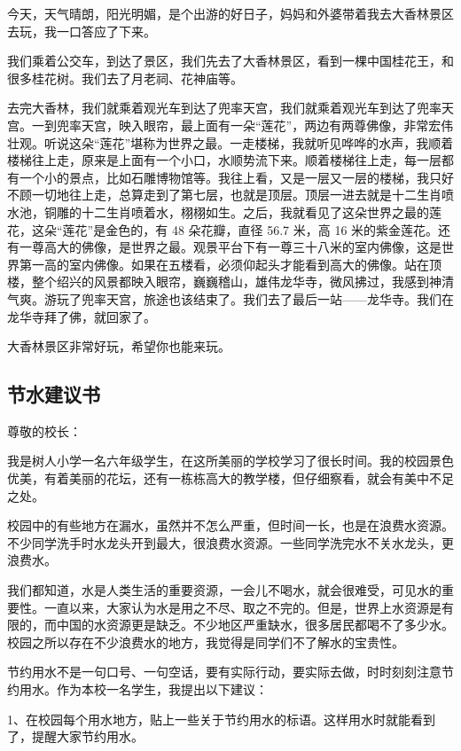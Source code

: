 \documentclass[UTF8,a4paper,titlepage,twoside,10.5pt]{article}
\begin{document}
今天，天气晴朗，阳光明媚，是个出游的好日子，妈妈和外婆带着我去大香林景区去玩，我一口答应了下来。

我们乘着公交车，到达了景区，我们先去了大香林景区，看到一棵中国桂花王，和很多桂花树。我们去了月老祠、花神庙等。

去完大香林，我们就乘着观光车到达了兜率天宫，我们就乘着观光车到达了兜率天宫。一到兜率天宫，映入眼帘，最上面有一朵“莲花”，两边有两尊佛像，非常宏伟壮观。听说这朵“莲花”堪称为世界之最。一走楼梯，我就听见哗哗的水声，我顺着楼梯往上走，原来是上面有一个小口，水顺势流下来。顺着楼梯往上走，每一层都有一个小的景点，比如石雕博物馆等。我往上看，又是一层又一层的楼梯，我只好不顾一切地往上走，总算走到了第七层，也就是顶层。顶层一进去就是十二生肖喷水池，铜雕的十二生肖喷着水，栩栩如生。之后，我就看见了这朵世界之最的莲花，这朵“莲花”是金色的，有 48 朵花瓣，直径 56.7 米，高 16 米的紫金莲花。还有一尊高大的佛像，是世界之最。观景平台下有一尊三十八米的室内佛像，这是世界第一高的室内佛像。如果在五楼看，必须仰起头才能看到高大的佛像。站在顶楼，整个绍兴的风景都映入眼帘，巍巍稽山，雄伟龙华寺，微风拂过，我感到神清气爽。游玩了兜率天宫，旅途也该结束了。我们去了最后一站——龙华寺。我们在龙华寺拜了佛，就回家了。

大香林景区非常好玩，希望你也能来玩。

\subsection{节水建议书}
\label{sec:org99beb25}

\noindent
尊敬的校长：

我是树人小学一名六年级学生，在这所美丽的学校学习了很长时间。我的校园景色优美，有着美丽的花坛，还有一栋栋高大的教学楼，但仔细察看，就会有美中不足之处。

校园中的有些地方在漏水，虽然并不怎么严重，但时间一长，也是在浪费水资源。不少同学洗手时水龙头开到最大，很浪费水资源。一些同学洗完水不关水龙头，更浪费水。

我们都知道，水是人类生活的重要资源，一会儿不喝水，就会很难受，可见水的重要性。一直以来，大家认为水是用之不尽、取之不完的。但是，世界上水资源是有限的，而中国的水资源更是缺乏。不少地区严重缺水，很多居民都喝不了多少水。校园之所以存在不少浪费水的地方，我觉得是同学们不了解水的宝贵性。

节约用水不是一句口号、一句空话，要有实际行动，要实际去做，时时刻刻注意节约用水。作为本校一名学生，我提出以下建议：

1、在校园每个用水地方，贴上一些关于节约用水的标语。这样用水时就能看到了，提醒大家节约用水。
\end{document}
